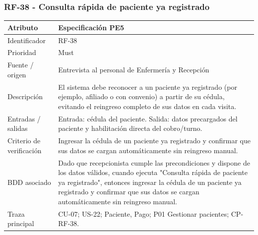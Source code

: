 \documentclass[11pt,a4paper]{article}
\begin{document}
	\subsubsection{RF-38 - Consulta rápida de paciente ya registrado}
	\begin{tabularx}{\textwidth}{p{3.2cm}Y}
		\toprule
		\textbf{Atributo} & \textbf{Especificación PE5}\\\midrule
		Identificador & RF-38\\
		Prioridad & Must\\
		Fuente / origen & Entrevista al personal de Enfermería y Recepción\\
		Descripción & El sistema debe reconocer a un paciente ya registrado (por ejemplo, afiliado o con convenio) a partir de su cédula, evitando el reingreso completo de sus datos en cada visita.\\
		Entradas / salidas & Entrada: cédula del paciente. Salida: datos precargados del paciente y habilitación directa del cobro/turno.\\
		Criterio de verificación & Ingresar la cédula de un paciente ya registrado y confirmar que sus datos se cargan automáticamente sin reingreso manual.\\
		BDD asociado & Dado que recepcionista cumple las precondiciones y dispone de los datos válidos, cuando ejecuta "Consulta rápida de paciente ya registrado", entonces ingresar la cédula de un paciente ya registrado y confirmar que sus datos se cargan automáticamente sin reingreso manual.\\
		Traza principal & CU-07; US-22; Paciente, Pago; P01 Gestionar pacientes; CP-RF-38.\\
		\bottomrule
	\end{tabularx}
	\clearpage
\end{document}
